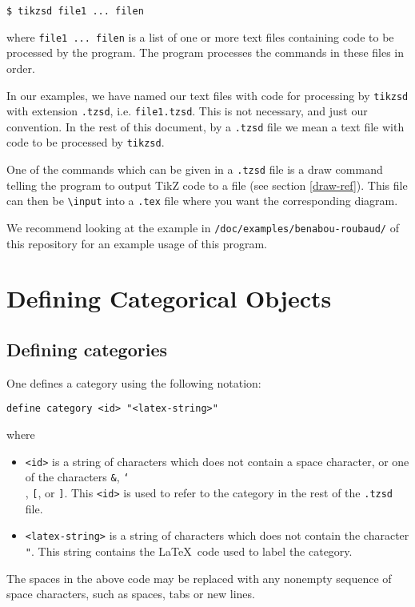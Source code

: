 \documentclass{amsart}
\newcommand{\vlength}{0.2cm}
\begin{document}
\vspace{\vlength}
\texttt{\$ tikzsd file1 ... filen}
\vspace{\vlength}

\noindent where \texttt{file1 ... filen} is a list of one or more text files
    containing code to be processed by the program.
The program processes the commands in these files in order.

In our examples, we have named our text files with code for processing
    by \texttt{tikzsd} with extension \texttt{.tzsd}, i.e.
    \texttt{file1.tzsd}.
This is not necessary, and just our convention.
In the rest of this document, by a \texttt{.tzsd} file we mean a text file
    with code to be processed by \texttt{tikzsd}.

One of the commands which can be given in a \texttt{.tzsd} file
    is a draw command telling the program to output TikZ code to a file
    (see section \ref{draw-ref}).
This file can then be \texttt{\textbackslash input} into a \texttt{.tex}
    file where you want the corresponding diagram.

We recommend looking at the example in \texttt{/doc/examples/benabou-roubaud/}
    of this repository for an example usage of this program.

\section{Defining Categorical Objects}
\subsection{Defining categories}
One defines a category using the following notation:

\vspace{\vlength}
\begin{verbatim}
define category <id> "<latex-string>"
\end{verbatim}
\vspace{\vlength}
where 
\begin{itemize}
    \item \texttt{<id>} is a string of characters which does not contain a space character,
        or one of the characters \texttt{\&}, \texttt{\char`\\}, \texttt{[}, or \texttt{]}.
    This \texttt{<id>} is used to refer to the category in the rest of the \texttt{.tzsd} file.
    \item \texttt{<latex-string>} is a string of characters which does not contain the character
        \texttt{"}.
    This string contains the \LaTeX \ code used to label the category.
\end{itemize}
The spaces in the above code may be replaced with any nonempty sequence of space characters,
    such as spaces, tabs or new lines.
\end{document}
